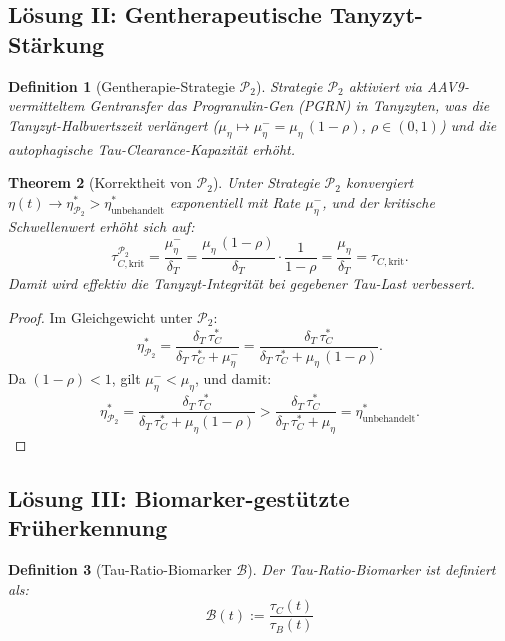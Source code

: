 ﻿\documentclass[12pt,a4paper]{article}
\newtheorem{theorem}{Theorem}[section]
\newtheorem{definition}[theorem]{Definition}
\theoremstyle{definition}
\begin{document}
	\subsection{Lösung II: Gentherapeutische Tanyzyt-Stärkung}
	
	\begin{definition}[Gentherapie-Strategie $\mathcal{P}_2$]
		Strategie $\mathcal{P}_2$ aktiviert via AAV9-vermitteltem Gentransfer das Progranulin-Gen (PGRN) in Tanyzyten, was die Tanyzyt-Halbwertszeit verlängert ($\mu_\eta \mapsto \mu_\eta^- = \mu_\eta\,(1-\rho)$, $\rho \in (0,1)$) und die autophagische Tau-Clearance-Kapazität erhöht.
	\end{definition}
	
	\begin{theorem}[Korrektheit von $\mathcal{P}_2$]
		\label{thm:p2_korrektheit}
		Unter Strategie $\mathcal{P}_2$ konvergiert $\eta(t) \to \eta_{\mathcal{P}_2}^* > \eta^*_{\text{unbehandelt}}$ exponentiell mit Rate $\mu_\eta^-$, und der kritische Schwellenwert erhöht sich auf:
		\[
		\tau_{C,\text{krit}}^{\mathcal{P}_2} = \frac{\mu_\eta^-}{\delta_T} = \frac{\mu_\eta\,(1-\rho)}{\delta_T} \cdot \frac{1}{1-\rho} = \frac{\mu_\eta}{\delta_T} = \tau_{C,\text{krit}}.
		\]
		Damit wird effektiv die Tanyzyt-Integrität bei gegebener Tau-Last verbessert.
	\end{theorem}
	
	\begin{proof}
		Im Gleichgewicht unter $\mathcal{P}_2$:
		\[
		\eta_{\mathcal{P}_2}^* = \frac{\delta_T\,\tau_C^*}{\delta_T\,\tau_C^* + \mu_\eta^-} = \frac{\delta_T\,\tau_C^*}{\delta_T\,\tau_C^* + \mu_\eta\,(1-\rho)}.
		\]
		Da $(1-\rho) < 1$, gilt $\mu_\eta^- < \mu_\eta$, und damit:
		\[
		\eta_{\mathcal{P}_2}^* = \frac{\delta_T\,\tau_C^*}{\delta_T\,\tau_C^* + \mu_\eta(1-\rho)} > \frac{\delta_T\,\tau_C^*}{\delta_T\,\tau_C^* + \mu_\eta} = \eta^*_{\text{unbehandelt}}.
		\]
	\end{proof}
	
	\subsection{Lösung III: Biomarker-gestützte Früherkennung}
	
	\begin{definition}[Tau-Ratio-Biomarker $\mathcal{B}$]
		Der \emph{Tau-Ratio-Biomarker} ist definiert als:
		\[
		\mathcal{B}(t) := \frac{\tau_C(t)}{\tau_B(t)}
		\]
	\end{definition}
	
\end{document}
